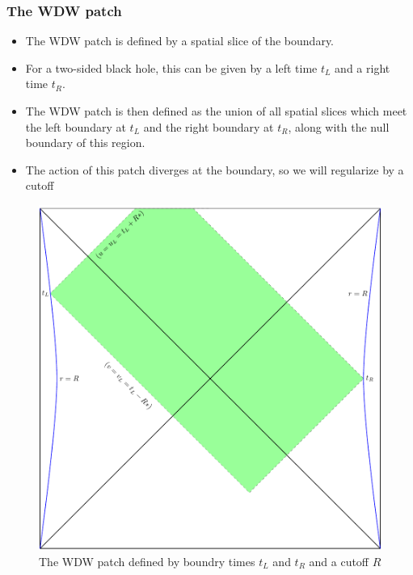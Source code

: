 \documentclass[8pt,aspectratio=169]{beamer}
\begin{document}
\begin{frame}
\frametitle{The WDW patch}

\begin{minipage}[t]{0.55\linewidth}

\begin{itemize}

\item The WDW patch is defined by a spatial slice of the boundary. 

\item For a two-sided black hole, this can be given by a left time $t_L$ and a right time $t_R$.

\item The WDW patch is then defined as the union of all spatial slices which meet the left boundary at $t_L$ and the right boundary at $t_R$, along with the null boundary of this region.

\item The action of this patch diverges at the boundary, so we will regularize by a cutoff

\end{itemize}

\end{minipage}\hfill
%
\begin{minipage}[t]{0.44\linewidth}

\begin{figure}
    \begin{center}
    
        \includegraphics[scale=0.4]{WDW2.pdf}    
    
    \end{center}
    \caption{The WDW patch defined by boundry times $t_L$ and $t_R$ and a cutoff $R$}
    \label{fig:WDW2}
\end{figure}

\end{minipage}

\end{frame}
\end{document}
